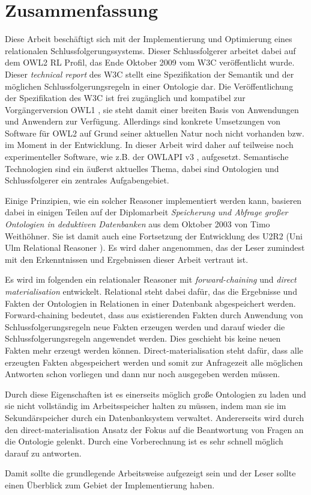 \section*{Zusammenfassung}

Diese Arbeit beschäftigt sich mit der Implementierung und Optimierung eines relationalen Schlussfolgerungssystems. Dieser Schlussfolgerer arbeitet dabei auf dem OWL2 RL Profil, das Ende Oktober 2009 vom W3C \cite{OWL2Profiles} veröffentlicht wurde. Dieser \emph{technical report} des W3C stellt eine Spezifikation der Semantik und der möglichen Schlussfolgerungsregeln in einer Ontologie dar. Die Veröffentlichung der Spezifikation des W3C ist frei zugänglich und kompatibel zur Vorgängerversion OWL1 \cite{OWL1}, sie steht damit einer breiten Basis von Anwendungen und Anwendern zur Verfügung. Allerdings sind konkrete Umsetzungen von Software für OWL2 auf Grund seiner aktuellen Natur noch nicht vorhanden bzw. im Moment in der Entwicklung. In dieser Arbeit wird daher auf teilweise noch experimenteller Software, wie z.B. der OWLAPI v3 \cite{OWLAPI}, aufgesetzt. Semantische Technologien sind ein äußerst aktuelles Thema, dabei sind Ontologien und Schlussfolgerer ein zentrales Aufgabengebiet.

Einige Prinzipien, wie ein solcher Reasoner implementiert werden kann, basieren dabei in einigen Teilen auf der Diplomarbeit \emph{Speicherung und Abfrage großer Ontologien in deduktiven Datenbanken} \cite{Weithoehner2003} aus dem Oktober 2003 von Timo Weithöhner. Sie ist damit auch eine Fortsetzung der Entwicklung des U2R2 (Uni Ulm Relational Reasoner \cite{Weithoehner2008}). Es wird daher angenommen, das der Leser zumindest mit den Erkenntnissen und Ergebnissen dieser Arbeit vertraut ist.

Es wird im folgenden ein relationaler Reasoner mit \emph{forward-chaining} und \emph{direct materialisation} entwickelt. Relational steht dabei dafür, das die Ergebnisse und Fakten der Ontologien in Relationen in einer Datenbank abgespeichert werden. Forward-chaining bedeutet, dass aus existierenden Fakten durch Anwendung von Schlussfolgerungsregeln neue Fakten erzeugen werden und darauf wieder die Schlussfolgerungsregeln angewendet werden. Dies geschieht bis keine neuen Fakten mehr erzeugt werden können. Direct-materialisation steht dafür, dass alle erzeugten Fakten abgespeichert werden und somit zur Anfragezeit alle möglichen Antworten schon vorliegen und dann nur noch ausgegeben werden müssen.

Durch diese Eigenschaften ist es einerseits möglich große Ontologien zu laden und sie nicht vollständig im Arbeitsspeicher halten zu müssen, indem man sie im Sekundärspeicher durch ein Datenbanksystem verwaltet. Andererseits wird durch den direct-materialisation Ansatz der Fokus auf die Beantwortung von Fragen an die Ontologie gelenkt. Durch eine Vorberechnung ist es sehr schnell möglich darauf zu antworten.

Damit sollte die grundlegende Arbeitsweise aufgezeigt sein und der Leser sollte einen Überblick zum Gebiet der Implementierung haben.